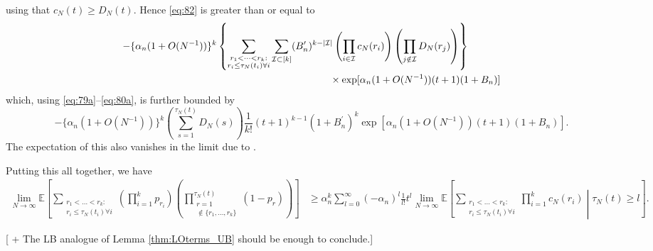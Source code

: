 \documentclass{article}
\newcommand{\E}{\mathbb{E}}
\newcommand{\1}[1]{\mathbbm{1}_{#1}}
\begin{document}
using that $c_N(t) \geq D_N(t)$.
Hence \eqref{eq:82} is greater than or equal to
\begin{align}
- \{ \alpha_n (1 + O(N^{-1}) ) \}^k
&\left\{ \sum_{\substack{r_1 <\dots< r_k :\\ r_i \leq \tau_N(t_i) \forall i}}
\sum_{\mathcal{I} \subset [k]} (B_n^\prime)^{k-|\mathcal{I}|}
\left( \prod_{i\in\mathcal{I}} c_N(r_i) \right)
\left( \prod_{j\notin\mathcal{I}} D_N(r_j) \right) \right\} \notag\\
&\hspace{4cm}\times \exp[ \alpha_n (1 + O(N^{-1}) ) (t+1) (1+B_n) ] 
\end{align}
which, using \eqref{eq:79a}--\eqref{eq:80a}, is further bounded by
\begin{equation}
- \{ \alpha_n (1 + O(N^{-1}) ) \}^k \left( \sum_{s=1}^{\tau_N(t)} D_N(s) \right) \frac{1}{k!} (t+1)^{k-1} (1 + B_n^\prime)^k 
\exp[ \alpha_n (1 + O(N^{-1}) ) (t+1) (1+B_n) ] .
\end{equation}
The expectation of this also vanishes in the limit due to \citet[Equation (5)]{brown2020}.

Putting this all together, we have
\begin{align}
\lim_{N\to\infty} \E \left[ \sum_{\substack{r_1 <\dots< r_k :\\ r_i \leq \tau_N(t_i) \forall i}}
\left( \prod_{i=1}^k p_{r_i} \right)
\left( \prod_{\substack{r=1 \\ \notin \{r_1,\dots,r_k\} }}^{\tau_N(t)} (1-p_r) \right) \right]
&\geq \alpha_n^k \sum_{l=0}^{\infty} (-\alpha_n)^l \frac{1}{l!} t^l 
\lim_{N\to\infty}\E \left[ \sum_{\substack{r_1 <\dots< r_k :\\ r_i \leq \tau_N(t_i) \forall i}} \prod_{i=1}^k c_N(r_i) \middle| \tau_N(t) \geq l \right] .
\end{align}

[ + The LB analogue of Lemma \ref{thm:LOterms_UB} should be enough to conclude.]





\end{document}
